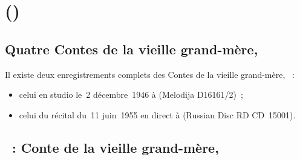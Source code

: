 \chapter[%
Sergej Prokof'ev (\Dates{1891-04-23}{1953-03-05})][%
Sergej Prokof'ev]{%
\SProkofiev{} ()}
\label{chap:Prokofiev}

\section*{%
Quatre Contes de la vieille grand-mère, }

Il existe deux enregistrements complets des Contes de la vieille grand-mère,
~:
\begin{itemize}
 \item
 celui en studio le~2 décembre~1946 à \Moscow (Melodija D16161/2)~;
 \item
 celui du récital du~11 juin~1955 en direct à \MSHM (Russian Disc
 RD CD~15001).
\end{itemize}

\section{\ifChrono \Prokofiev{}~: \fi
Conte de la vieille grand-mère,  }
\label{\thesection}

\begin{workitemize}
 \item{}
 \begin{perfitemize}
  \item{}
  \item{}
 \end{perfitemize}
 \item{}
 \begin{perfitemize}
  \item{}
 \end{perfitemize}
\end{workitemize}

